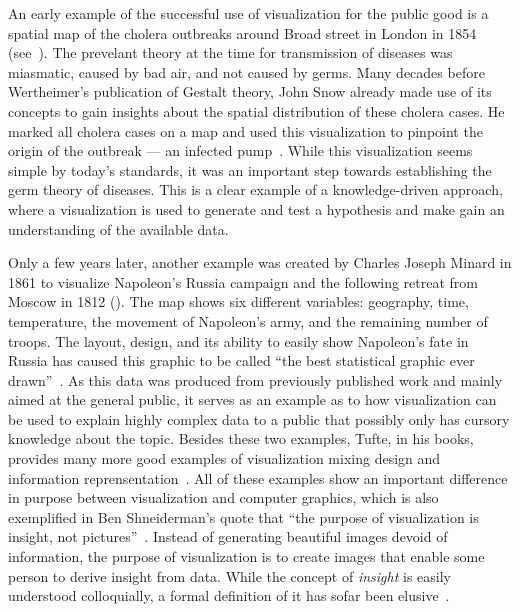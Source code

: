 An early example of the successful use of visualization for the public good is a spatial map of the cholera outbreaks around Broad street in London in 1854 (see~).  The prevelant theory at the time for transmission of diseases was miasmatic, caused by bad air, and not caused by germs.  Many decades before Wertheimer's publication of Gestalt theory, John Snow already made use of its concepts to gain insights about the spatial distribution of these cholera cases.  He marked all cholera cases on a map and used this visualization to pinpoint the origin of the outbreak --- an infected pump~\cite{snow1855mode}.  While this visualization seems simple by today's standards, it was an important step towards establishing the germ theory of diseases.  This is a clear example of a knowledge-driven approach, where a visualization is used to generate and test a hypothesis and make gain an understanding of the available data.

Only a few years later, another example was created by Charles Joseph Minard in 1861 to visualize Napoleon's Russia campaign and the following retreat from Moscow in 1812 ().  The map shows six different variables: geography, time, temperature, the movement of Napoleon’s army, and the remaining number of troops.  The layout, design, and its ability to easily show Napoleon's fate in Russia has caused this graphic to be called ``the best statistical graphic ever drawn''~\cite{tufte1983visual}.  As this data was produced from previously published work and mainly aimed at the general public, it serves as an example as to how visualization can be used to explain highly complex data to a public that possibly only has cursory knowledge about the topic.  Besides these two examples, Tufte, in his books, provides many more good examples of visualization mixing design and information reprensentation~\cite{tufte1991envisioning}.  All of these examples show an important difference in purpose between visualization and computer graphics, which is also exemplified in Ben Shneiderman's quote that ``the purpose of visualization is insight, not pictures''~\cite{card1999readings}.  Instead of generating beautiful images devoid of information, the purpose of visualization is to create images that enable some person to derive insight from data.  While the concept of \emph{insight} is easily understood colloquially, a formal definition of it has sofar been elusive~\cite{north2006toward}.

